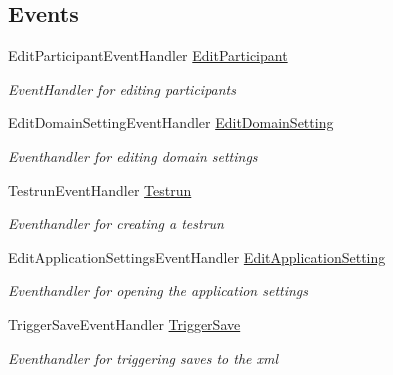 \subsection*{Events}
\begin{DoxyCompactItemize}
\item 
Edit\+Participant\+Event\+Handler \hyperlink{class_web_analyzer_1_1_u_i_1_1_h_t_m_l_u_i_a41d7bba18de0e030779e1bc57de9d267}{Edit\+Participant}
\begin{DoxyCompactList}\small\item\em Event\+Handler for editing participants \end{DoxyCompactList}\item 
Edit\+Domain\+Setting\+Event\+Handler \hyperlink{class_web_analyzer_1_1_u_i_1_1_h_t_m_l_u_i_aec067a24868c0ce06c3dd5ca4caccd8b}{Edit\+Domain\+Setting}
\begin{DoxyCompactList}\small\item\em Eventhandler for editing domain settings \end{DoxyCompactList}\item 
Testrun\+Event\+Handler \hyperlink{class_web_analyzer_1_1_u_i_1_1_h_t_m_l_u_i_adb77cf3b6fe81466fc13561570764024}{Testrun}
\begin{DoxyCompactList}\small\item\em Eventhandler for creating a testrun \end{DoxyCompactList}\item 
Edit\+Application\+Settings\+Event\+Handler \hyperlink{class_web_analyzer_1_1_u_i_1_1_h_t_m_l_u_i_ab0a670a0a2407499af7b073c9f180657}{Edit\+Application\+Setting}
\begin{DoxyCompactList}\small\item\em Eventhandler for opening the application settings \end{DoxyCompactList}\item 
Trigger\+Save\+Event\+Handler \hyperlink{class_web_analyzer_1_1_u_i_1_1_h_t_m_l_u_i_a88837323ee334b87422f0d8cf1897952}{Trigger\+Save}
\begin{DoxyCompactList}\small\item\em Eventhandler for triggering saves to the xml \end{DoxyCompactList}\end{DoxyCompactItemize}

